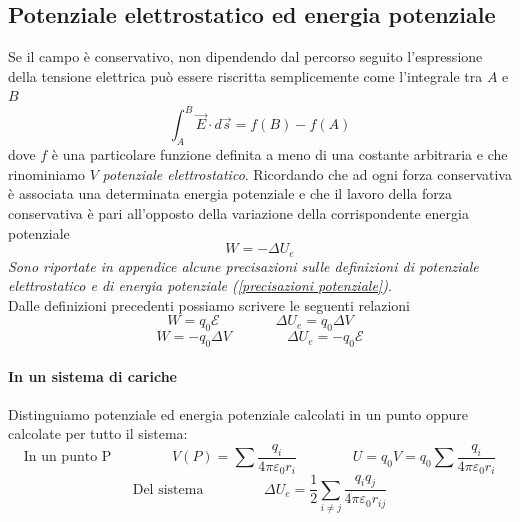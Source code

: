 \documentclass[x11names]{report}
\begin{document}
\subsection{Potenziale elettrostatico ed energia potenziale}
Se il campo è conservativo, non dipendendo dal percorso  seguito l'espressione della tensione elettrica può essere riscritta semplicemente come l'integrale tra \(A\) e \(B\) 
\[
\int_{A}^B\vec{E}\cdot d\vec{s} = f(B) - f(A)
\]
dove \(f\) è una particolare funzione definita a meno di una costante arbitraria e che rinominiamo \(V\) \textit{potenziale elettrostatico}. 
Ricordando che ad ogni forza conservativa è associata una determinata energia potenziale e che il lavoro della forza conservativa è pari all'opposto della variazione della corrispondente energia potenziale
\[
W = -\Delta U_e
\]
\textit{Sono riportate in appendice alcune precisazioni sulle definizioni di potenziale elettrostatico e di energia potenziale (\ref{precisazioni potenziale})}. \\


\noindent
Dalle definizioni precedenti possiamo scrivere le seguenti relazioni
\[
W = q_0 \mathcal{E}  \qquad\qquad \Delta U_e = q_0 \Delta V
\]
\[
W = -q_0 \Delta V \qquad\qquad  \Delta U_e = - q_0 \mathcal{E}
\]


\paragraph{In un sistema di cariche}
Distinguiamo potenziale ed energia potenziale calcolati in un punto oppure calcolate per tutto il sistema:
\[
	\text{In un punto P }  \qquad\qquad V(P) = \sum \frac{q_i}{4\pi \varepsilon_0 r_i} \qquad \qquad U = q_0V = q_0 \sum \frac{q_i}{4\pi \varepsilon_0 r_i} 
\]
\[
	\text{Del sistema } \qquad\qquad  \Delta U_e =  \frac{1}{2}\sum_{i\neq j} \frac{q_iq_j}{4\pi \varepsilon_0 r_{ij}} 
\]
\end{document}
